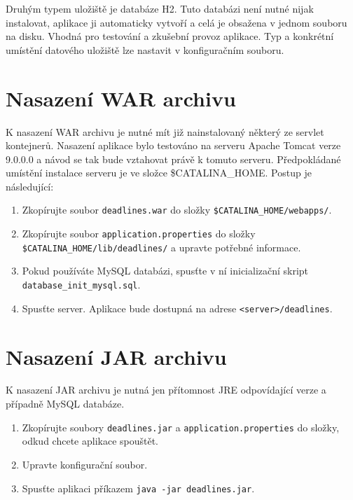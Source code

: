 \documentclass[thesis=B,czech]{FITthesis}[2012/06/26]
\begin{document}
		Druhým typem uložiště je databáze H2. Tuto databázi není nutné nijak instalovat, aplikace ji automaticky vytvoří a celá je obsažena v jednom souboru na disku. Vhodná pro testování a zkušební provoz aplikace. Typ a konkrétní umístění datového uložiště lze nastavit v konfiguračním souboru.
	
	\section{Nasazení WAR archivu}
		K nasazení WAR archivu je nutné mít již nainstalovaný některý ze servlet kontejnerů. Nasazení aplikace bylo testováno na serveru Apache Tomcat verze 9.0.0.0 a návod se tak bude vztahovat právě k tomuto serveru. Předpokládané umístění instalace serveru je ve složce \$CATALINA\_HOME. Postup je následující:
		\begin{enumerate}
			\item Zkopírujte soubor \texttt{deadlines.war} do složky \texttt{\$CATALINA\_HOME/\allowbreak webapps/}.
			\item Zkopírujte soubor \texttt{application.properties} do složky \texttt{\$CATALINA\_HOME/\allowbreak lib/\allowbreak deadlines/} a upravte potřebné informace.
			\item Pokud používáte MySQL databázi, spusťte v ní inicializační skript \texttt{database\_init\_mysql.sql}.
			\item Spusťte server. Aplikace bude dostupná na adrese \texttt{<server>/deadlines}.
		\end{enumerate}
	
	\section{Nasazení JAR archivu}
		K nasazení JAR archivu je nutná jen přítomnost JRE odpovídající verze a případně MySQL databáze.
		\begin{enumerate}
			\item Zkopírujte soubory \texttt{deadlines.jar} a \texttt{application.properties} do složky, odkud chcete aplikace spouštět.
			\item Upravte konfigurační soubor.
			\item Spusťte aplikaci příkazem \texttt{java -jar deadlines.jar}.
		\end{enumerate}
		
	

\end{document}
